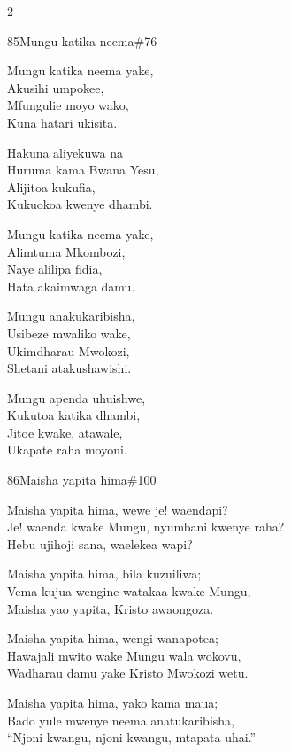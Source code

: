 \documentclass{article}
\begin{document}
\begin{multicols}{2}
\begin{hymn}{85}{Mungu katika neema}{\#76}
\begin{stanza}
Mungu katika neema yake,\\
Akusihi umpokee,\\
Mfungulie moyo wako,\\
Kuna hatari ukisita.
\end{stanza}
\begin{chorus}
Hakuna aliyekuwa na\\
Huruma kama Bwana Yesu,\\
Alijitoa kukufia,\\
Kukuokoa kwenye dhambi.
\end{chorus}
\begin{stanza}
Mungu katika neema yake,\\
Alimtuma Mkombozi,\\
Naye alilipa fidia,\\
Hata akaimwaga damu.
\end{stanza}
\begin{stanza}
Mungu anakukaribisha,\\
Usibeze mwaliko wake,\\
Ukimdharau Mwokozi,\\
Shetani atakushawishi.
\end{stanza}
\begin{stanza}
Mungu apenda uhuishwe,\\
Kukutoa katika dhambi,\\
Jitoe kwake, atawale,\\
Ukapate raha moyoni.
\end{stanza}
\end{hymn}

\begin{hymn}{86}{Maisha yapita hima}{\#100}
\begin{stanza}
Maisha yapita hima, wewe je! waendapi?\\
Je! waenda kwake Mungu, nyumbani kwenye raha?\\
Hebu ujihoji sana, waelekea wapi?
\end{stanza}
\begin{stanza}
Maisha yapita hima, bila kuzuiliwa;\\
Vema kujua wengine watakaa kwake Mungu,\\
Maisha yao yapita, Kristo awaongoza.
\end{stanza}
\begin{stanza}
Maisha yapita hima, wengi wanapotea;\\
Hawajali mwito wake Mungu wala wokovu,\\
Wadharau damu yake Kristo Mwokozi wetu.
\end{stanza}
\begin{stanza}
Maisha yapita hima, yako kama maua;\\
Bado yule mwenye neema anatukaribisha,\\
``Njoni kwangu, njoni kwangu, mtapata uhai.''
\end{stanza}
\end{hymn}


\end{multicols}
\end{document}
